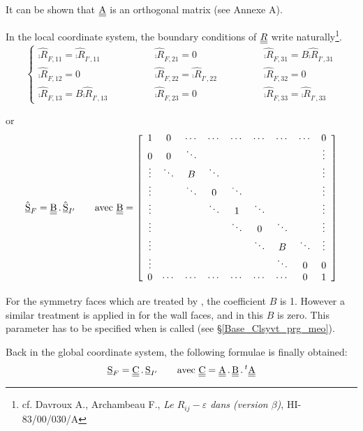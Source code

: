 It can be shown that $\underline{\underline{\textrm{A}}}$ is an orthogonal matrix (see Annexe A).

In the local coordinate system, the boundary conditions of $\underline{\underline{R}}$
write naturally\footnote{cf. Davroux A., Archambeau F., {\em Le
$R_{ij}-\varepsilon$ dans \CS (version $\beta$)}, HI-83/00/030/A}.
\begin{equation}
\label{Base_Clsyvt_eq_clRij}%
\left\{\begin{array}{lll}
\hat{\comp{R}}_{F,11}=\hat{\comp{R}}_{I',11} \qquad\qquad&
\hat{\comp{R}}_{F,21}=0 \qquad\qquad&
\hat{\comp{R}}_{F,31}=B\hat{\comp{R}}_{I',31} \\
\hat{\comp{R}}_{F,12}=0 \qquad\qquad&
\hat{\comp{R}}_{F,22}=\hat{\comp{R}}_{I',22} \qquad\qquad&
\hat{\comp{R}}_{F,32}=0 \\
\hat{\comp{R}}_{F,13}=B\hat{\comp{R}}_{I',13} \qquad\qquad&
\hat{\comp{R}}_{F,23}=0 \qquad\qquad&
\hat{\comp{R}}_{F,33}=\hat{\comp{R}}_{I',33}
\end{array}\right.
\end{equation}

or
\renewcommand{\arraystretch}{0.5}
\begin{equation}
\hat{\underline{\textrm{S}}}_F=\underline{\underline{\textrm{B}}}\,.\,\hat{\underline{\textrm{S}}}_{I'}
\qquad\text{avec }\underline{\underline{\textrm{B}}}=
\left[\begin{array}{ccccccccc}
1&0&\cdots&\cdots&\cdots&\cdots&\cdots&\cdots&0\\
0&0&\ddots&&&&&&\vdots\\
\vdots&\ddots&B&\ddots&&&&&\vdots\\
\vdots&&\ddots&0&\ddots&&&&\vdots\\
\vdots&&&\ddots&1&\ddots&&&\vdots\\
\vdots&&&&\ddots&0&\ddots&&\vdots\\
\vdots&&&&&\ddots&B&\ddots&\vdots\\
\vdots&&&&&&\ddots&0&0\\
0&\cdots&\cdots&\cdots&\cdots&\cdots&\cdots&0&1
\end{array}\right]
\end{equation}
\renewcommand{\arraystretch}{1.}


For the symmetry faces which are treated by , the
coefficient $B$ is 1. However a similar treatment is applied in
 for the wall faces, and in this $B$ is zero. This
parameter has to be specified when  is called
(see \S\ref{Base_Clsyvt_prg_meo}).

Back in the global coordinate system, the following formulae is
finally obtained:
\begin{equation}
\label{eq:base:clsyvt:cl_s}
\underline{\textrm{S}}_F=\underline{\underline{\textrm{C}}}\,.\,\underline{\textrm{S}}_{I'}\qquad
\text{avec }\underline{\underline{\textrm{C}}}=\underline{\underline{\textrm{A}}}\,.\,\underline{\underline{\textrm{B}}}\,.\,^t\underline{\underline{\textrm{A}}}
\end{equation}

